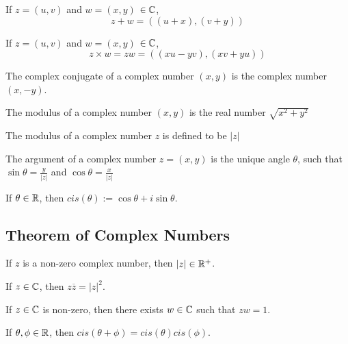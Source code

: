 \documentclass[a4paper]{article}
\begin{document}
\begin{ndefi}[Addition of $\C$]
If $z = (u, v )$ and $w = (x, y)$ $\in \mathbb{C}$,
$$z + w = ((u+x),(v+y))$$
\end{ndefi}

\begin{ndefi}[Multiplication of $\C$]
If $z = (u, v )$ and $w = (x, y)$ $\in \mathbb{C}$,
$$z \times w = zw = ((xu - yv), (xv + yu))$$
\end{ndefi}

\begin{ndefi}[Conjugate]
The complex conjugate of a complex number $(x,y)$ is the complex number $(x,−y)$.
\end{ndefi}

\begin{ndefi}[Modulus]
The modulus of a complex number $(x, y)$ is the real number $\sqrt{x^2 + y^2}$
\end{ndefi}
\begin{notation}
The modulus of a complex number $z$ is defined to be $|z|$
\end{notation}

\begin{ndefi}[Argument]
The argument of a complex number $z = (x, y)$ is the unique angle $\theta$, such that $\sin \theta = \frac{y}{|z|}$ and $\cos \theta = \frac{x}{|z|}$
\end{ndefi}

\begin{ndefi}[cis]
If $\theta \in \mathbb{R}$, then $cis(\theta) := \cos \theta + i \sin \theta$.
\end{ndefi}

\subsection{Theorem of Complex Numbers}
\begin{nthm}[$|z| \in \R^+$]
If $z$ is a non-zero complex number, then $|z| \in \R^+$.
\end{nthm}

\begin{nthm}
If $z \in \mathbb{C}$, then $z\overline{z} = |z|^2$.
\end{nthm}

\begin{nthm}[Inverse]
If $z \in \mathbb{C}$ is non-zero, then there exists $w \in \mathbb{C}$ such that $zw = 1$.
\end{nthm}

\begin{nthm}
If $\theta, \phi \in \mathbb{R}$, then $cis(\theta + \phi) = cis(\theta)cis(\phi)$.
\end{nthm}
\end{document}
